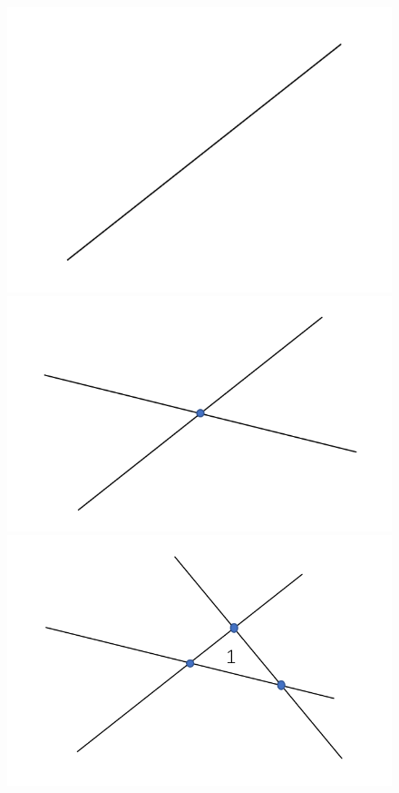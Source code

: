 \documentclass[a4paper]{article}
\begin{document}
\begin{figure}[htb]
	\centering
	\includegraphics[scale=0.5]{Q61.png}
	\includegraphics[scale=0.5]{Q62.png}
	\includegraphics[scale=0.5]{Q63.png}

\end{figure}
\end{document}
